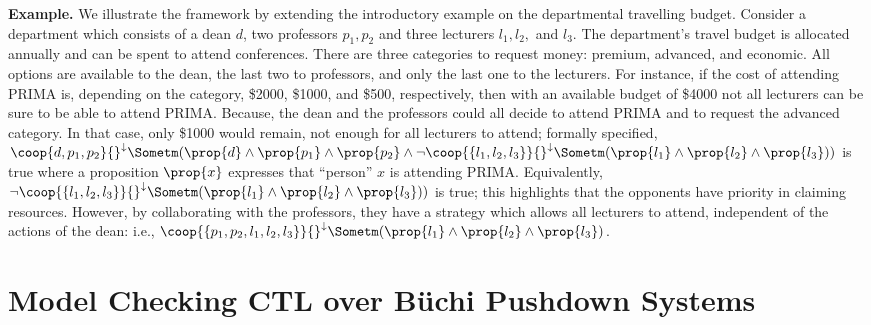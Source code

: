 \documentclass{llncs}
\newcommand{\coopdown}[2][]{\ensuremath{\coop{#2}{}_{#1}^{\downarrow}}}
\begin{document}
\textbf{Example.} We illustrate the framework by extending  the introductory example on the departmental 
travelling budget. Consider a  department
which consists of a dean $d$, two professors $p_1, p_2$ and three lecturers 
$l_1, l_2,$ and $l_3$. The department's  travel budget 
is allocated  annually and can be spent 
to attend  conferences. 
There
are three categories to request money: premium, 
advanced, and economic. All options are available to the dean,
the last two to professors, and only the last one to the lecturers.
For instance, if the cost of attending PRIMA is, depending on the category, \$2000, \$1000, and \$500,  
respectively, then with an available budget of \$4000 not all lecturers can be sure to be able to attend PRIMA. Because,  the dean and the professors could all decide to attend PRIMA and to request the advanced category. In that case, only \$1000 would remain, not enough  for all lecturers to attend; formally specified,  
$\coopdown{d,p_1,p_2}\Sometm(\prop{d}\wedge \prop{p_1}\wedge\prop{p_2}\wedge\neg \coopdown{\{l_1,l_2,l_3\}}\Sometm(\prop{l_1}\wedge \prop{l_2}\wedge\prop{l_3}))$ is true where a proposition $\prop{x}$ expresses that ``person'' $x$ is attending PRIMA. Equivalently, $\neg \coopdown{\{l_1,l_2,l_3\}}\Sometm(\prop{l_1}\wedge \prop{l_2}\wedge\prop{l_3}))$ is true; this highlights that the opponents have priority in claiming resources. However, by collaborating with the professors, they have a strategy which allows all lecturers to attend, independent of the actions of the dean: 
i.e., $\coopdown{\{p_1,p_2,l_1,l_2,l_3\}}\Sometm (\prop{l_1}\wedge \prop{l_2}\wedge\prop{l_3})$.


\section{Model Checking CTL over B\"uchi Pushdown Systems}\label{sec:ABPDS}
\newcommand{\PDS}{\ensuremath{\mathcal{P}}\xspace}
\newcommand{\APDS}{\ensuremath{\mathcal{P}}\xspace}
\newcommand{\AAut}{\ensuremath{\mathcal{A}}\xspace}
\newcommand{\Lc}{\ensuremath{\widehat{L}}\xspace}
\newcommand{\ABPDS}{\ensuremath{\mathcal{B}}\xspace}
\newcommand{\Pre}{\ensuremath{\mathsf{Pre}}\xspace}
\newcommand{\Cnf}{\ensuremath{\mathsf{Cnf}}\xspace}
\newcommand{\Post}{\ensuremath{\mathsf{Post}}\xspace}
\newcommand{\cl}{\ensuremath{\mathsf{cl}}\xspace}
\newcommand{\lab}{\ensuremath{\mathsf{lab}}\xspace}
\newcommand{\Release}{\ensuremath{\mathbf{R}}\xspace}
\newcommand{\CABPDS}{\ensuremath{\mathcal{C}}\xspace}
\end{document}
